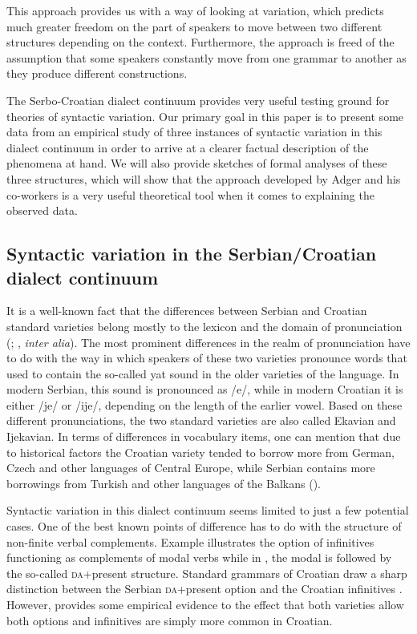 \documentclass[output=paper,modfonts,newtxmath,hidelinks,]{langscibook}
\begin{document}
This approach provides us with a way of looking at variation, which predicts much greater freedom on the part of speakers to move between two different structures depending on the context. Furthermore, the approach is freed of the assumption that some speakers constantly move from one grammar to another as they produce different constructions.

The Serbo-Croatian dialect continuum provides very useful testing ground for theories of syntactic variation. Our primary goal in this paper is to present some data from an empirical study of three instances of syntactic variation in this dialect continuum in order to arrive at a clearer factual description of the phenomena at hand. We will also provide sketches of formal analyses of these three structures, which will show that the approach developed by Adger and his co-workers is a very useful theoretical tool when it comes to explaining the observed data.

\subsection{Syntactic variation in the Serbian/Croatian dialect continuum}\label{7:s1.2}

It is a well-known fact that the differences between Serbian and Croatian standard varieties belong mostly to the lexicon and the domain of pronunciation (\citealt{CorbettBrowne2009}; \citealt{Bailyn2010}, \textit{inter alia}). The most prominent differences in the realm of pronunciation have to do with the way in which speakers of these two varieties pronounce words that used to contain the so-called yat sound in the older varieties of the language. In modern Serbian, this sound is pronounced as /e/, while in modern Croatian it is either /je/ or /ije/, depending on the length of the earlier vowel. Based on these different pronunciations, the two standard varieties are also called Ekavian and Ijekavian. In terms of differences in vocabulary items, one can mention that due to historical factors the Croatian variety tended to borrow more from German, Czech and other languages of Central Europe, while Serbian contains more borrowings from Turkish and other languages of the Balkans (\citealt{CorbettBrowne2009}).

Syntactic variation in this dialect continuum seems limited to just a few potential cases. One of the best known points of difference has to do with the structure of non-finite verbal complements. Example  illustrates the option of infinitives functioning as complements of modal verbs while in , the modal is followed by the so-called \textsc{da}+present structure. Standard grammars of Croatian draw a sharp distinction between the Serbian \textsc{da}+present option and the Croatian infinitives \citep{Katicic}. However, \citet{Bailyn2010} provides some empirical evidence to the effect that both varieties allow both options and infinitives are simply more common in Croatian.
\end{document}
